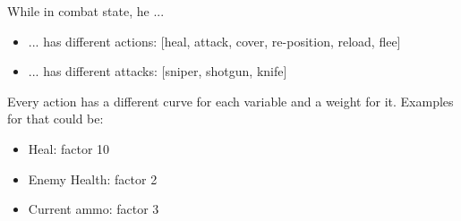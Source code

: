 While in combat state, he ...
\begin{itemize}
    \item ... has different actions: [heal, attack, cover, re-position, reload, flee]
    \item ... has different attacks: [sniper, shotgun, knife]
\end{itemize}

Every action has a different curve for each variable and a weight for it. Examples for that could be:

\begin{itemize}
    \item Heal: factor 10
    \item Enemy Health: factor 2
    \item Current ammo: factor 3
\end{itemize}
